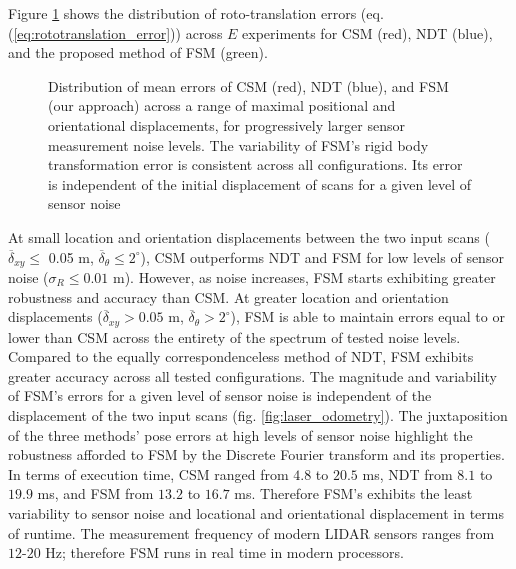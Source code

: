 Figure \ref{fig:errors_sm} shows the distribution of roto-translation errors
(eq. (\ref{eq:rototranslation_error})) across $E$ experiments for CSM (red),
NDT (blue), and the proposed method of FSM (green).

\begin{figure}[]\centering
  \vspace{-1.5cm}
  
  \vspace{-1.5cm}
  \caption{\small Distribution of mean errors of CSM (red), NDT (blue), and
           FSM (our approach) across a range of maximal positional and
           orientational displacements, for progressively larger sensor
           measurement noise levels. The variability of FSM's rigid body
           transformation error is consistent across all configurations. Its
           error is independent of the initial displacement of scans for a
           given level of sensor noise}
  \label{fig:errors_sm}
\end{figure}

At small location and orientation displacements between the two input scans
($\overline{\delta}_{xy} \leq $ 0.05 m,
$\overline{\delta}_\theta \leq 2^\circ$), CSM outperforms NDT and FSM for low
levels of sensor noise ($\sigma_R \leq 0.01$ m). However, as noise increases,
FSM starts exhibiting greater robustness and accuracy than CSM. At
greater location and orientation displacements
($\overline{\delta}_{xy} > 0.05$ m,
$\overline{\delta}_\theta > 2^\circ$), FSM is able to maintain errors equal to
or lower than CSM across the entirety of the spectrum of tested noise levels.
Compared to the equally correspondenceless method of NDT, FSM exhibits greater
accuracy across all tested configurations. The magnitude and variability of
FSM's errors for a given level of sensor noise is independent of the
displacement of the two input scans (fig. \ref{fig:laser_odometry}). The
juxtaposition of the three methods' pose errors at high levels of sensor noise
highlight the robustness afforded to FSM by the Discrete Fourier transform and
its properties. In terms of execution time, CSM ranged from $4.8$ to $20.5$ ms,
NDT from $8.1$ to $19.9$ ms, and FSM from $13.2$ to $16.7$ ms. Therefore FSM's
exhibits the least variability to sensor noise and locational and orientational
displacement in terms of runtime.  The measurement frequency of modern LIDAR
sensors ranges from $12$-$20$ Hz; therefore FSM runs in real time in modern
processors.
